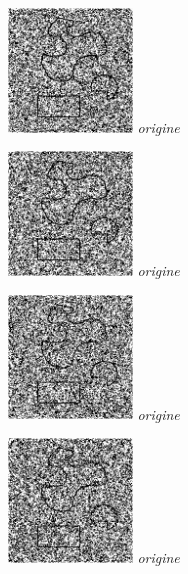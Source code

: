 \documentclass[a4,12pt]{article}
\begin{document}
\begin{minipage}[c]{0.20\linewidth}
	\begin{center}
		\includegraphics[width = 33mm]{./img/p2test_grad_mean_formes2bb25b.jpg}
		\textit{origine}
	\end{center}
\end{minipage}
\begin{minipage}[c]{0.20\linewidth}
	\begin{center}
		\includegraphics[width = 33mm]{./img/p2test_grad_mean_formes2bb25.jpg}
		\textit{origine}
	\end{center}
\end{minipage}
\begin{minipage}[c]{0.20\linewidth}
	\begin{center}
		\includegraphics[width = 33mm]{./img/p2test_grad_mean_formes2bb30b.jpg}
		\textit{origine}
	\end{center}
\end{minipage}
\begin{minipage}[c]{0.20\linewidth}
	\begin{center}
		\includegraphics[width = 33mm]{./img/p2test_grad_mean_formes2bb30.jpg}
		\textit{origine}
	\end{center}
\end{minipage}
\end{document}
